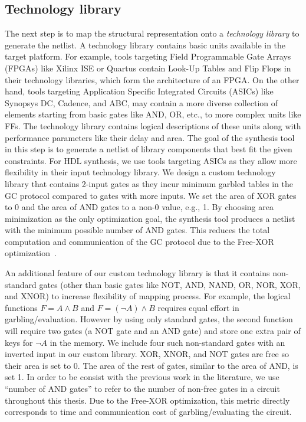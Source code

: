 \subsection{Technology library}\label{sect:syn-tech}
The next step is to map the structural representation onto a \emph{technology library} to generate the netlist.
A technology library contains basic units available in the target platform.
For example, tools targeting Field Programmable Gate Arrays (FPGAs) like Xilinx ISE or Quartus contain Look-Up Tables and Flip Flops in their technology libraries, which form the architecture of an FPGA.
On the other hand, tools targeting Application Specific Integrated Circuits (ASICs) like Synopsys DC, Cadence, and ABC, may contain a more diverse collection of elements starting from basic gates like AND, OR, etc., to more complex units like FFs.
The technology library contains logical descriptions of these units along with performance parameters like their delay and area.
The goal of the synthesis tool in this step is to generate a netlist of library components that best fit the given constraints.
For HDL synthesis, we use tools targeting ASICs as they allow more flexibility in their input technology library.
We design a custom technology library that contains 2-input gates as they incur minimum garbled tables in the GC protocol compared to gates with more inputs.
We set the area of XOR gates to 0 and the area of AND gates to a non-0 value, e.g., 1.
By choosing area minimization as the only optimization goal, the synthesis tool produces a netlist with the minimum possible number of AND gates.
This reduces the total computation and communication of the GC protocol due to the Free-XOR optimization~\cite{kolesnikov2008improved}.

An additional feature of our custom technology library is that it contains non-standard gates (other than basic gates like NOT, AND, NAND, OR, NOR, XOR, and XNOR) to increase flexibility of mapping process.
For example, the logical functions $F = A\wedge B$ and $F = (\neg A)\wedge B$ requires equal effort in garbling/evaluation.
However by using only standard gates, the second function will require two gates (a NOT gate and an AND gate) and store one extra pair of keys for $\neg A$ in the memory.
We include four such non-standard gates with an inverted input in our custom library.
XOR, XNOR, and NOT gates are free so their area is set to 0.
The area of the rest of gates, similar to the area of AND, is set 1.
In order to be consist with the previous work in the literature, we use ``number of AND gates'' to refer to the number of non-free gates in a circuit throughout this thesis.
Due to the Free-XOR optimization, this metric directly corresponds to time and communication cost of garbling/evaluating the circuit.

